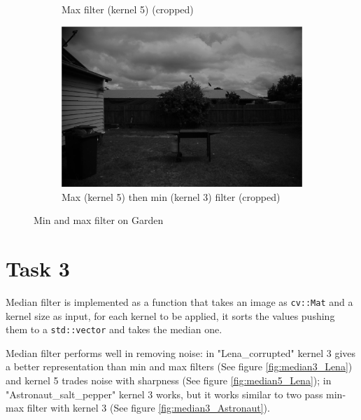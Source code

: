 \documentclass{article}
\begin{document}
\begin{figure}[H]
\begin{subfigure}{0.45\textwidth}
		\caption{Max filter (kernel 5) (cropped)}
	\end{subfigure}

	\begin{subfigure}{0.45\textwidth}
		\includegraphics[trim={20cm 25cm 25cm 10cm},clip,width=\textwidth]{Generated/Garden_max5min3filter.png}
		\caption{Max (kernel 5) then min (kernel 3) filter (cropped)}
	\end{subfigure}
	\caption{Min and max filter on Garden}
	\label{fig:min_max_Garden}
\end{figure}


\section*{Task 3}
Median filter is implemented as a function that takes an image as \texttt{cv::Mat} and a kernel size as input, for each kernel to be applied, it sorts the values pushing them to a \texttt{std::vector} and takes the median one.

Median filter performs well in removing noise: in "Lena\_corrupted" kernel 3 gives a better representation than min and max filters (See figure \ref{fig:median3_Lena}) and kernel 5 trades noise with sharpness (See figure \ref{fig:median5_Lena}); in "Astronaut\_salt\_pepper" kernel 3 works, but it works similar to two pass min-max filter with kernel 3 (See figure \ref{fig:median3_Astronaut}).
\end{document}
